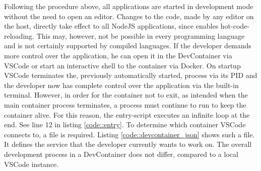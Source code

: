         Following the procedure above, all applications are started in development mode without the need to open an editor. Changes to the code, made by any editor on the host, directly take effect to all NodeJS applications, since  enables hot-code-reloading. This may, however, not be possible in every programming language and is not certainly supported by compiled languages.\newline
        If the developer demands more control over the application, he can open it in the DevContainer via \ac{VSCode} or start an interactive shell to the container via Docker. On startup \ac{VSCode} terminates the, previously automatically started, process via its \ac{PID} and the developer now has complete control over the application via the built-in terminal. However, in order for the container not to exit, as intended when the main container process terminates, a process must continue to run to keep the container alive. For this reason, the entry-script executes an infinite loop at the end. See line 12 in listing \ref{code::entry}. To determine which container \ac{VSCode} connects to, a  file is required. Listing \ref{code::devcontainer_json} shows such a  file. It defines the service that the developer currently wants to work on. The overall development process in a DevContainer does not differ, compared to a local \ac{VSCode} instance.

